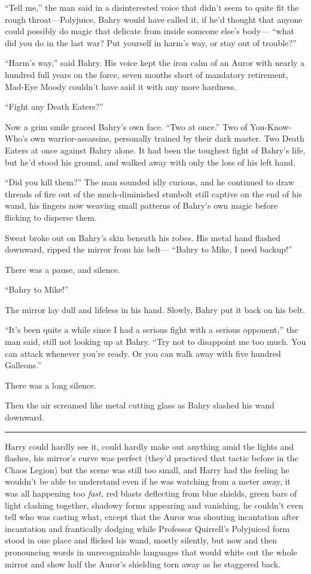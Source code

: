 ``Tell me,'' the man said in a disinterested voice that didn't seem to
quite fit the rough throat---Polyjuice, Bahry would have called it, if
he'd thought that anyone could possibly do magic that delicate from
inside someone else's body--- ``what did you do in the last war? Put
yourself in harm's way, or stay out of trouble?''

``Harm's way,'' said Bahry. His voice kept the iron calm of an Auror
with nearly a hundred full years on the force, seven months short of
mandatory retirement, Mad-Eye Moody couldn't have said it with any more
hardness.

``Fight any Death Eaters?''

Now a grim smile graced Bahry's own face. ``Two at once.'' Two of
You-Know-Who's own warrior-assassins, personally trained by their dark
master. Two Death Eaters at once against Bahry alone. It had been the
toughest fight of Bahry's life, but he'd stood his ground, and walked
away with only the loss of his left hand.

``Did you kill them?'' The man sounded idly curious, and he continued to
draw threads of fire out of the much-diminished stunbolt still captive
on the end of his wand, his fingers now weaving small patterns of
Bahry's own magic before flicking to disperse them.

Sweat broke out on Bahry's skin beneath his robes. His metal hand
flashed downward, ripped the mirror from his belt--- ``Bahry to Mike, I
need backup!''

There was a pause, and silence.

``Bahry to Mike!''

The mirror lay dull and lifeless in his hand. Slowly, Bahry put it back
on his belt.

``It's been quite a while since I had a serious fight with a serious
opponent,'' the man said, still not looking up at Bahry. ``Try not to
disappoint me too much. You can attack whenever you're ready. Or you can
walk away with five hundred Galleons.''

There was a long silence.

Then the air screamed like metal cutting glass as Bahry slashed his wand
downward.

\begin{center}\rule{3in}{0.4pt}\end{center}

Harry could hardly see it, could hardly make out anything amid the
lights and flashes, his mirror's curve was perfect (they'd practiced
that tactic before in the Chaos Legion) but the scene was still too
small, and Harry had the feeling he wouldn't be able to understand even
if he was watching from a meter away, it was all happening too
\emph{fast,} red blasts deflecting from blue shields, green bars of
light clashing together, shadowy forms appearing and vanishing, he
couldn't even tell who was casting what, except that the Auror was
shouting incantation after incantation and frantically dodging while
Professor Quirrell's Polyjuiced form stood in one place and flicked his
wand, mostly silently, but now and then pronouncing words in
unrecognizable languages that would white out the whole mirror and show
half the Auror's shielding torn away as he staggered back.

